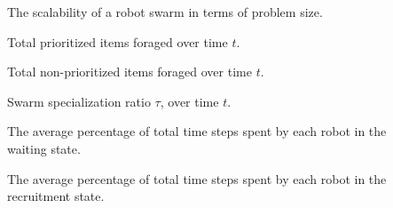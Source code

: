 \begin{description}
	\item[\parbox{\namewidth}{$S_p$}] The scalability of a robot swarm in terms of problem size.	
	
	\item[\parbox{\namewidth}{$E^t_P$}] Total prioritized items foraged over time $t$.	

	\item[\parbox{\namewidth}{$E^t_{NP}$}] Total non-prioritized items foraged over time $t$.	
	
	\item[\parbox{\namewidth}{$\tau_t$}] Swarm specialization ratio $\tau$, over time $t$.	

	\item[\parbox{\namewidth}{$t_{wait}$}] The average percentage of total time steps spent by each robot in the waiting state.

	\item[\parbox{\namewidth}{$t_{recruitment}$}] The average percentage of total time steps spent by each robot in the recruitment state. 
	
	\item[\parbox{\namewidth}{$E_P$} The percentage of the total number of prioritized]
\end{description}
